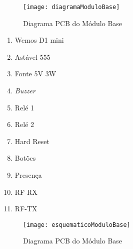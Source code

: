 \begin{figure}[H]
	\centering
	\caption{Diagrama PCB do Módulo Base}
  \texttt{[image: diagramaModuloBase]}
\label{fig:diagramaModuloBase}
\end{figure}

\begin{enumerate}
\item Wemos D1 mini
\item Astável 555
\item Fonte 5V 3W
\item \textit{Buzzer}
\item Relé 1
\item Relé 2
\item Hard Reset
\item Botões
\item Presença
\item RF-RX
\item RF-TX
\end{enumerate}

\begin{figure}[H]
	\centering
	\caption{Diagrama PCB do Módulo Base}
  \texttt{[image: esquematicoModuloBase]}
\label{fig:esquematicoModuloBase}
\end{figure}


